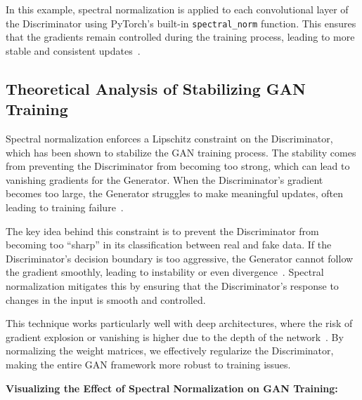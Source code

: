 In this example, spectral normalization is applied to each convolutional layer of the Discriminator using PyTorch's built-in \texttt{spectral\_norm} function. This ensures that the gradients remain controlled during the training process, leading to more stable and consistent updates~\cite{bjorck2021towards}.

\subsection{Theoretical Analysis of Stabilizing GAN Training}
Spectral normalization enforces a Lipschitz constraint on the Discriminator, which has been shown to stabilize the GAN training process. The stability comes from preventing the Discriminator from becoming too strong, which can lead to vanishing gradients for the Generator. When the Discriminator's gradient becomes too large, the Generator struggles to make meaningful updates, often leading to training failure~\cite{miyato2018spectral, bjorck2021towards}.

The key idea behind this constraint is to prevent the Discriminator from becoming too ``sharp'' in its classification between real and fake data. If the Discriminator's decision boundary is too aggressive, the Generator cannot follow the gradient smoothly, leading to instability or even divergence~\cite{lin2021spectral}. Spectral normalization mitigates this by ensuring that the Discriminator's response to changes in the input is smooth and controlled.

This technique works particularly well with deep architectures, where the risk of gradient explosion or vanishing is higher due to the depth of the network~\cite{miyato2018spectral, lin2021spectral}. By normalizing the weight matrices, we effectively regularize the Discriminator, making the entire GAN framework more robust to training issues.

\textbf{Visualizing the Effect of Spectral Normalization on GAN Training:}

\begin{center}
\end{center}

